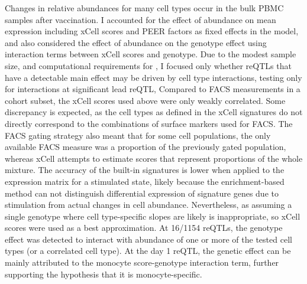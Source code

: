 Changes in relative abundances for many cell types occur in the bulk PBMC samples after vaccination.
I accounted for the effect of abundance on mean expression including xCell scores and PEER factors as fixed effects in the model,
and also considered the effect of abundance on the genotype effect using interaction terms between xCell scores and genotype.
Due to the modest sample size, and computational requirements for , 
I focused only whether reQTLs that have a detectable main effect may be driven by cell type interactions,
testing only for interactions at significant lead \gls{reQTL},
%
Compared to FACS measurements in a cohort subset, the xCell scores used above were only weakly correlated.
Some discrepancy is expected, as the cell types as defined in the xCell signatures do not directly correspond to the combinations of surface markers used for FACS.
The FACS gating strategy also meant that for some cell populations, the only available FACS measure was a proportion of the previously gated population,
whereas xCell attempts to estimate scores that represent proportions of the whole mixture.
The accuracy of the built-in signatures is lower when applied to the expression matrix for a stimulated state,
likely because the enrichment-based method can not distinguish differential expression of signature genes due to stimulation from actual changes in cell abundance.
Nevertheless, as assuming a single genotype where cell type-specific slopes are likely is inappropriate, so xCell scores were used as a best approximation.
%
At 16/1154 reQTLs, the genotype effect was detected to interact with abundance of one or more of the tested cell types (or a correlated cell type).
At the day 1  reQTL, the genetic effect can be mainly attributed to the monocyte score-genotype interaction term, further supporting the hypothesis that it is monocyte-specific.


